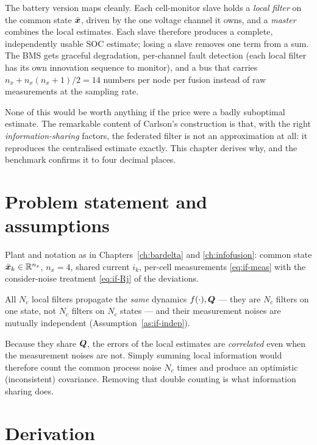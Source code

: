 The battery version maps cleanly. Each cell-monitor slave holds a \emph{local filter} on the
common state $\bar{\bm{x}}$, driven by the one voltage channel it owns, and a \emph{master} combines
the local estimates. Each slave therefore produces a complete, independently usable SOC estimate;
losing a slave removes one term from a sum. The BMS gets graceful degradation, per-channel fault
detection (each local filter has its own innovation sequence to monitor), and a bus that carries
$n_x + n_x(n_x{+}1)/2 = 14$ numbers per node per fusion instead of raw measurements at the
sampling rate.

None of this would be worth anything if the price were a badly suboptimal estimate. The remarkable
content of Carlson's construction is that, with the right \emph{information-sharing} factors, the
federated filter is not an approximation at all: it reproduces the centralised estimate exactly.
This chapter derives why, and the benchmark confirms it to four decimal places.

\section{Problem statement and assumptions}
Plant and notation as in Chapters~\ref{ch:bardelta} and \ref{ch:infofusion}: common state
$\bar{\bm{x}}_k\in\mathbb{R}^{n_x}$, $n_x=4$, shared current $i_k$, per-cell measurements
\eqref{eq:if-meas} with the consider-noise treatment \eqref{eq:if-Rj} of the deviations.

\begin{assumption}\label{as:fed-common}
All $N_c$ local filters propagate the \emph{same} dynamics $f(\cdot),\bm{Q}$ --- they are $N_c$
filters on one state, not $N_c$ filters on $N_c$ states --- and their measurement noises are
mutually independent (Assumption~\ref{as:if-indep}).
\end{assumption}
\begin{assumption}\label{as:fed-corr}
Because they share $\bm{Q}$, the errors of the local estimates are \emph{correlated} even when the
measurement noises are not. Simply summing local information would therefore count the common
process noise $N_c$ times and produce an optimistic (inconsistent) covariance. Removing that
double counting is what information sharing does.
\end{assumption}

\section{Derivation}

